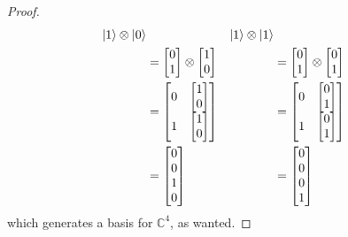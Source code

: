 \documentclass{beamer}
\renewcommand{\ket}{\Ket}
\renewcommand{\ket}{\Ket}
\newcommand{\tensor}{\otimes}
\newcommand{\bb}[1]{\mathbb{#1}}
\begin{document}
\begin{frame}
\begin{proof}
            \begin{align*}
            \ket{1} \tensor \ket{0} & & \ket{1} \tensor \ket{1}\\
            &= \begin{bmatrix} 0 \\ 1 \end{bmatrix} \tensor \begin{bmatrix} 1 \\ 0 \end{bmatrix} & &= \begin{bmatrix} 0 \\ 1 \end{bmatrix} \tensor \begin{bmatrix} 0 \\ 1 \end{bmatrix}\\
            &= \begin{bmatrix} 0 & \begin{bmatrix} 1 \\ 0 \end{bmatrix} \\ 1 & \begin{bmatrix} 1 \\ 0 \end{bmatrix} \end{bmatrix} & &= \begin{bmatrix} 0 & \begin{bmatrix} 0 \\ 1 \end{bmatrix} \\ 1 & \begin{bmatrix} 0 \\ 1 \end{bmatrix} \end{bmatrix}\\
            &= \begin{bmatrix} 0 \\ 0 \\ 1 \\ 0 \end{bmatrix} &&= \begin{bmatrix} 0 \\ 0 \\ 0 \\ 1 \end{bmatrix}
            \end{align*}
            which generates a basis for $\bb{C}^{4}$, as wanted.
        \end{proof}
\end{frame}
\end{document}
